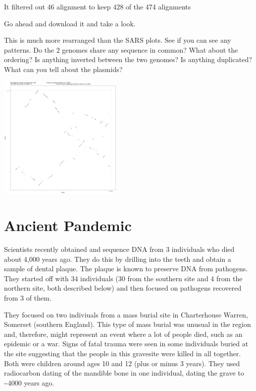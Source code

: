 \documentclass[
]{book}
\begin{document}
It filtered out 46 alignment to keep 428 of the 474 alignments

\hfill\break

Go ahead and download it and take a look.

This is much more rearranged than the SARS plots. See if you can see any patterns. Do the 2 genomes share any sequence in common? What about the ordering? Is anything inverted between the two genomes? Is anything duplicated? What can you tell about the plasmids?

\includegraphics[width=0.45\textwidth,height=\textheight]{./Figures/YexYp.png}

\hypertarget{ancient-pandemic}{%
\chapter{Ancient Pandemic}\label{ancient-pandemic}}

Scientists recently obtained and sequence DNA from 3 individuals who died about 4,000 years ago. They do this by drilling into the teeth and obtain a sample of dental plaque. The plaque is known to preserve DNA from pathogens. They started off with 34 individuals (30 from the southern site and 4 from the northern site, both described below) and then focused on pathogens recovered from 3 of them.

They focused on two indiviuals from a mass burial site in Charterhouse Warren, Somerset (southern England). This type of mass burial was unusual in the region and, therefore, might represent an event where a lot of people died, such as an epidemic or a war. Signs of fatal trauma were seen in some individuals buried at the site suggesting that the people in this gravesite were killed in all together. Both were children around ages 10 and 12 (plus or minus 3 years). They used radiocarbon dating of the mandible bone in one individual, dating the grave to \textasciitilde4000 years ago.
\end{document}
